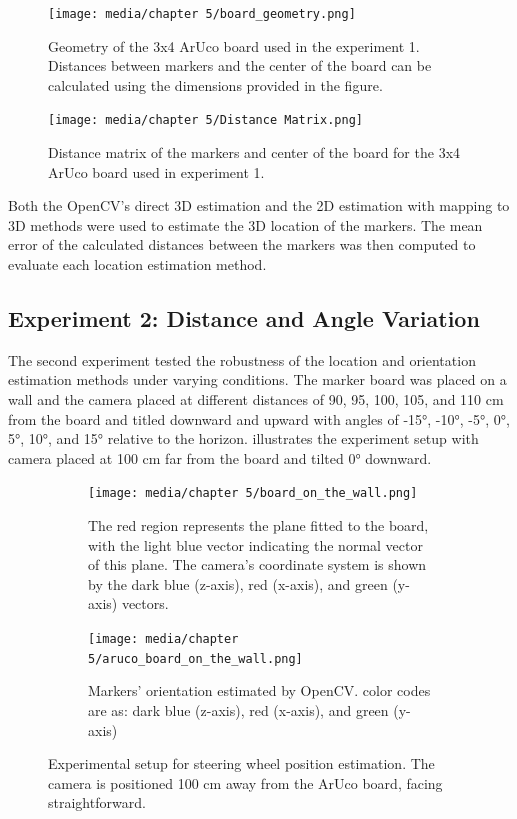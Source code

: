 \begin{figure}[htpb]
    \centering
    \texttt{[image: media/chapter 5/board\_geometry.png]}
    \caption{Geometry of the 3x4 ArUco board used in the experiment 1. Distances between markers and the center of the board can be calculated using the dimensions provided in the figure.}
    \label{fig:marker_dimention}
\end{figure}

\begin{figure}[htpb]
    \centering
    \texttt{[image: media/chapter 5/Distance Matrix.png]}
    \caption{Distance matrix of the markers and center of the board for the 3x4 ArUco board used in experiment 1.}
    \label{fig:distance_matrix}
\end{figure}

Both the OpenCV's direct 3D estimation and the 2D estimation with mapping to 3D methods were used to estimate the 3D location of the markers. The mean error of the calculated distances between the markers was then computed to evaluate each location estimation method.

\subsection{Experiment 2: Distance and Angle Variation}
The second experiment tested the robustness of the location and orientation estimation methods under varying conditions. The marker board was placed on a wall and the camera placed at different distances of  90, 95, 100, 105, and 110 cm from the board and titled downward and upward with angles of -15°, -10°, -5°, 0°, 5°, 10°, and 15° relative to the horizon.  illustrates the experiment setup with camera placed at 100 cm far from the board and tilted 0° downward. 

\begin{figure}[htpb]
    \centering
    \begin{subfigure}[t]{0.45\textwidth}
        \centering
        \texttt{[image: media/chapter 5/board\_on\_the\_wall.png]}
        \caption{The red region represents the plane fitted to the board, with the light blue vector indicating the normal vector of this plane. The camera’s coordinate system is shown by the dark blue (z-axis), red (x-axis), and green (y-axis) vectors.}
        \label{fig:board_on_wall_plain_fitting}
    \end{subfigure}\hfill
    \begin{subfigure}[t]{0.45\textwidth}
        \centering
        \texttt{[image: media/chapter 5/aruco\_board\_on\_the\_wall.png]}
        \caption{Markers' orientation estimated by OpenCV. color codes are as: dark blue (z-axis), red (x-axis), and green (y-axis)}
        \label{fig:board_on_wall_opencv}
    \end{subfigure}
    \caption{Experimental setup for steering wheel position estimation. The camera is positioned 100 cm away from the ArUco board, facing straightforward.}
\end{figure}

